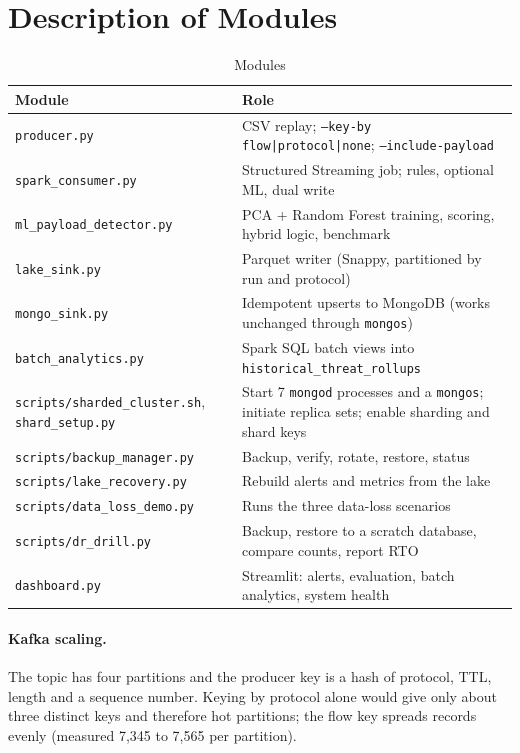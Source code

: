 \section{Description of Modules}
\begin{table}[H]
\centering
\small
\begin{tabular}{|p{4.3cm}|p{9cm}|}
\hline
\textbf{Module} & \textbf{Role} \\ \hline
\texttt{producer.py} & CSV replay; \texttt{--key-by flow|protocol|none}; \texttt{--include-payload} \\ \hline
\texttt{spark\_consumer.py} & Structured Streaming job; rules, optional ML, dual write \\ \hline
\texttt{ml\_payload\_detector.py} & PCA + Random Forest training, scoring, hybrid logic, benchmark \\ \hline
\texttt{lake\_sink.py} & Parquet writer (Snappy, partitioned by run and protocol) \\ \hline
\texttt{mongo\_sink.py} & Idempotent upserts to MongoDB (works unchanged through \texttt{mongos}) \\ \hline
\texttt{batch\_analytics.py} & Spark SQL batch views into \texttt{historical\_threat\_rollups} \\ \hline
\texttt{scripts/sharded\_cluster.sh}, \texttt{shard\_setup.py} & Start 7 \texttt{mongod} processes and a \texttt{mongos}; initiate replica sets; enable sharding and shard keys \\ \hline
\texttt{scripts/backup\_manager.py} & Backup, verify, rotate, restore, status \\ \hline
\texttt{scripts/lake\_recovery.py} & Rebuild alerts and metrics from the lake \\ \hline
\texttt{scripts/data\_loss\_demo.py} & Runs the three data-loss scenarios \\ \hline
\texttt{scripts/dr\_drill.py} & Backup, restore to a scratch database, compare counts, report RTO \\ \hline
\texttt{dashboard.py} & Streamlit: alerts, evaluation, batch analytics, system health \\ \hline
\end{tabular}
\caption{Modules}\label{tab:modules}
\end{table}

\paragraph{Kafka scaling.} The topic has four partitions and the producer key is a hash of protocol, TTL, length and a sequence number. Keying by protocol alone would give only about three distinct keys and therefore hot partitions; the flow key spreads records evenly (measured 7,345 to 7,565 per partition).

